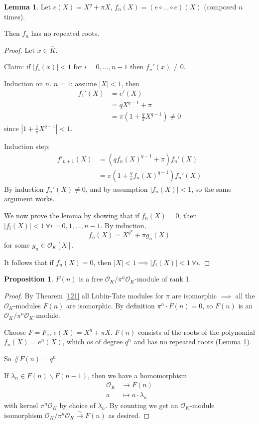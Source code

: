 \documentclass[a4paper]{article}
\theoremstyle{definition}
\theoremstyle{default}
\newtheorem{lemma}[definition]{Lemma}
\newtheorem{prop}[definition]{Proposition}
\theoremstyle{remark}
\newcommand*\abs[1]{\left|#1\right|}
\begin{document}
\begin{lemma}
	Let $e(X) = X^q+\pi X$, $f_n(X) = (e \circ \dots \circ e)(X)$ (composed $n$ times).
	
	Then $f_n$ has no repeated roots.
	\label{124}
\end{lemma}
\begin{proof}
	Let $x \in \bar{K}$.
	
	Claim: if $\abs{f_i(x)} < 1$ for $i=0, \dots, n-1$ then $f_n'(x) \neq 0$.
	
	Induction on $n$. $n=1$: assume $\abs{X} < 1$, then
	\begin{align*}
		f_1'(X) &= e'(X) \\
		&= qX^{q-1} + \pi \\
		&= \pi(1+\frac{q}{\pi}X^{q-1}) \neq 0
	\end{align*}
	since $\abs{1+\frac{1}{\pi}X^{q-1}} < 1$.
	
	Induction step:
	\begin{align*}
		f'_{n+1}(X) &= (qf_n(X)^{q-1} + \pi)f_n'(X) \\
		&= \pi(1+\frac{q}{\pi}f_n(X)^{q-1})f_n'(X)
	\end{align*}
	By induction $f_n'(X) \neq 0$, and by assumption $\abs{f_n(X)} < 1$,
	so the same argument works.
	
	We now prove the lemma by showing that if $f_n(X) = 0$,
	then $\abs{f_i(X)} < 1\ \forall i = 0, 1, \dots, n-1$.
	By induction,
	$$f_n(X) = X^{q^n}+\pi g_n(X)$$
	for some $g_n \in \mathcal{O}_K[X]$.
	
	It follows that if $f_n(X)=0$,
	then $\abs{X} < 1 \implies \abs{f_i(X)} < 1\ \forall i$.
\end{proof}

\begin{prop}
	$F(n)$ is a free $\mathcal{O}_K/\pi^n\mathcal{O}_K $-module of rank 1.
\end{prop}
\begin{proof}
	By Theorem \ref{121} all Lubin-Tate modules for $\pi$ are isomorphic
	$\implies$ all the $\mathcal{O}_K$-modules $F(n)$ are isomorphic.
	By definition $\pi^n \cdot F(n) = 0$,
	so $F(n)$ is an $\mathcal{O}_K/\pi^n\mathcal{O}_K$-module.
	
	Choose $F=F_e$, $e(X) = X^q+\pi X$.
	$F(n)$ consists of the roots of the polynomial $f_n(X)=e^n(X)$,
	which os of degree $q^n$ and has no repeated roots (Lemma \ref{124}).
	
	So $\# F(n) = q^n$.
	
	If $\lambda_n \in F(n)\backslash F(n-1)$,
	then we have a homomorphism
	\begin{align*}
		\mathcal{O}_K &\to F(n) \\
		a &\mapsto a \cdot \lambda_n
	\end{align*}
	with kernel $\pi^n \mathcal{O}_K$ by choice of $\lambda_n$.
	By counting we get an $\mathcal{O}_K$-module isomorphism
	$\mathcal{O}_K/\pi^n\mathcal{O}_K \overset{\sim}{\longrightarrow} F(n)$ as desired.
\end{proof}
\end{document}
